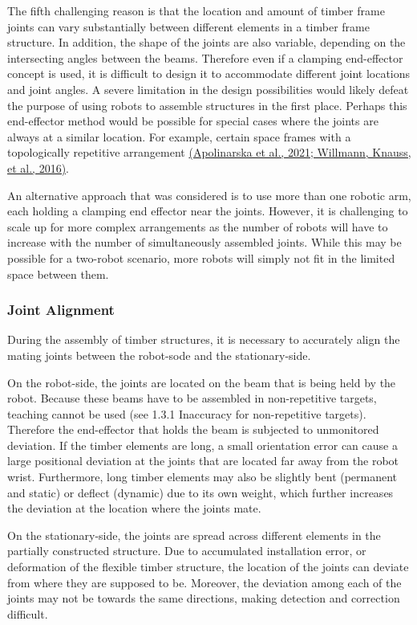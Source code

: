 \documentclass[11pt]{book}
\begin{document}
The fifth challenging reason is that the location and amount of timber frame joints can vary substantially between different elements in a timber frame structure. In addition, the shape of the joints are also variable, depending on the intersecting angles between the beams. Therefore even if a clamping end-effector concept is used, it is difficult to design it to accommodate different joint locations and joint angles. A severe limitation in the design possibilities would likely defeat the purpose of using robots to assemble structures in the first place. Perhaps this end-effector method would be possible for special cases where the joints are always at a similar location. For example, certain space frames with a topologically repetitive arrangement \href{https://www.zotero.org/google-docs/?UUeya7}{(Apolinarska et al., 2021; Willmann, Knauss, et al., 2016)}. 

An alternative approach that was considered is to use more than one robotic arm, each holding a clamping end effector near the joints. However, it is challenging to scale up for more complex arrangements as the number of robots will have to increase with the number of simultaneously assembled joints. While this may be possible for a two-robot scenario, more robots will simply not fit in the limited space between them.

\subsubsection{Joint Alignment}

During the assembly of timber structures, it is necessary to accurately align the mating joints between the robot-sode and the stationary-side.

On the robot-side, the joints are located on the beam that is being held by the robot. Because these beams have to be assembled in non-repetitive targets, teaching cannot be used (see 1.3.1 Inaccuracy for non-repetitive targets). Therefore the end-effector that holds the beam is subjected to unmonitored deviation. If the timber elements are long, a small orientation error can cause a large positional deviation at the joints that are located far away from the robot wrist. Furthermore, long timber elements may also be slightly bent (permanent and static) or deflect (dynamic) due to its own weight, which further increases the deviation at the location where the joints mate.

On the stationary-side, the joints are spread across different elements in the partially constructed structure. Due to accumulated installation error, or deformation of the flexible timber structure, the location of the joints can deviate from where they are supposed to be. Moreover, the deviation among each of the joints may not be towards the same directions, making detection and correction difficult.
\end{document}
